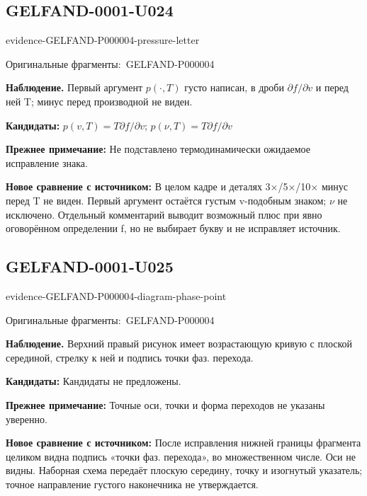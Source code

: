 \documentclass[11pt]{article}
\newcommand{\EvidenceBlock}[4]{%
 \par\smallskip\noindent\begin{minipage}{\linewidth}
 \begin{minipage}[t]{.47\linewidth}\vspace{0pt}\centering
 \csname evidence-#1-#2\endcsname\par
 {\scriptsize\SourceCropCaption\ #1}\par
 \end{minipage}\hfill
 \begin{minipage}[t]{.49\linewidth}\vspace{0pt}\raggedright
 {\small\color{orange!65!black}\textbf{#4} #3}\par
 \end{minipage}
 \end{minipage}\par\smallskip}
\newcommand{\SourceCropCaption}{Оригинальные фрагменты:}\newcommand{\ReadingCaption}{Сомнительное чтение.}\newcommand{\IncompleteCaption}{Неразобранный фрагмент.}\newcommand{\DiagramCaption}{Рисунок и набранное описание.}
\begin{document}
\subsection*{GELFAND-0001-U024}
\EvidenceBlock{GELFAND-P000004}{pressure-letter}{Первый аргумент \(p(\cdot,T)\) густо написан, в дроби \(\partial f/\partial v\) и перед ней T; минус перед производной не виден.}{Наблюдение.}
\par\smallskip\noindent\textbf{Кандидаты: } \(p(v,T)=T\partial f/\partial v\); \(p(\nu,T)=T\partial f/\partial v\)\par
\par\smallskip\noindent\textbf{Прежнее примечание: } Не подставлено термодинамически ожидаемое исправление знака.\par
\par\smallskip\noindent\textbf{Новое сравнение с источником: } В целом кадре и деталях 3×/5×/10× минус перед T не виден. Первый аргумент остаётся густым v-подобным знаком; \(\nu\) не исключено. Отдельный комментарий выводит возможный плюс при явно оговорённом определении f, но не выбирает букву и не исправляет источник.\par

\subsection*{GELFAND-0001-U025}
\EvidenceBlock{GELFAND-P000004}{diagram-phase-point}{Верхний правый рисунок имеет возрастающую кривую с плоской серединой, стрелку к ней и подпись точки фаз. перехода.}{Наблюдение.}
\par\smallskip\noindent\textbf{Кандидаты: } Кандидаты не предложены.\par
\par\smallskip\noindent\textbf{Прежнее примечание: } Точные оси, точки и форма переходов не указаны уверенно.\par
\par\smallskip\noindent\textbf{Новое сравнение с источником: } После исправления нижней границы фрагмента целиком видна подпись «точки фаз. перехода», во множественном числе. Оси не видны. Наборная схема передаёт плоскую середину, точку и изогнутый указатель; точное направление густого наконечника не утверждается.\par
\end{document}
